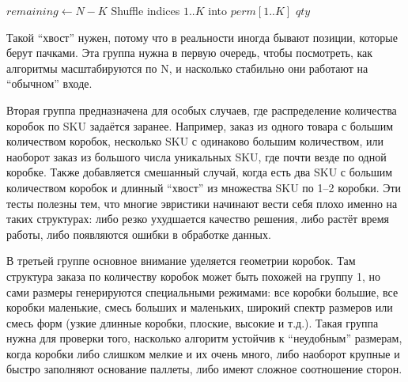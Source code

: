 \begin{algorithm}[H]
\caption{Distribute box counts across SKUs with a fixed total}
$remaining \leftarrow N - K$\;
Shuffle indices $1..K$ into $perm[1..K]$\;
\Return $qty$\;
\end{algorithm}
Такой “хвост” нужен, потому что в реальности иногда бывают позиции, которые берут пачками. Эта группа нужна в первую очередь, чтобы посмотреть, как алгоритмы масштабируются по N, и насколько стабильно они работают на “обычном” входе.


Вторая группа предназначена для особых случаев, где распределение количества коробок по SKU задаётся заранее. Например, заказ из одного товара с большим количеством коробок, несколько SKU с одинаково большим количеством, или наоборот заказ из большого числа уникальных SKU, где почти везде по одной коробке. Также добавляется смешанный случай, когда есть два SKU с большим количеством коробок и длинный “хвост” из множества SKU по 1–2 коробки. Эти тесты полезны тем, что многие эвристики начинают вести себя плохо именно на таких структурах: либо резко ухудшается качество решения, либо растёт время работы, либо появляются ошибки в обработке данных.

В третьей группе основное внимание уделяется геометрии коробок. Там структура заказа по количеству коробок может быть похожей на группу 1, но сами размеры генерируются специальными режимами: все коробки большие, все коробки маленькие, смесь больших и маленьких, широкий спектр размеров или смесь форм (узкие длинные коробки, плоские, высокие и т.д.). Такая группа нужна для проверки того, насколько алгоритм устойчив к “неудобным” размерам, когда коробки либо слишком мелкие и их очень много, либо наоборот крупные и быстро заполняют основание паллеты, либо имеют сложное соотношение сторон.

